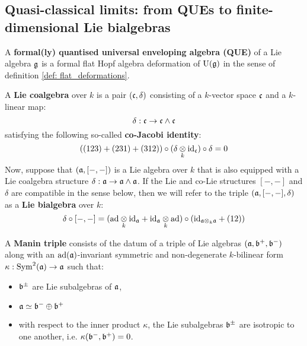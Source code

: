     \subsection{Quasi-classical limits: from QUEs to finite-dimensional Lie bialgebras}
        \begin{definition} \label{def: formal_QUEs}
            A \textbf{formal(ly) quantised universal enveloping algebra (QUE)} of a Lie algebra $\mathfrak{g}$ is a formal flat Hopf algebra deformation of $\mathrm{U}(\mathfrak{g})$ in the sense of definition \ref{def: flat_deformations}.
        \end{definition}
    
        \begin{definition} \label{def: lie_co/bialgebras}
            A \textbf{Lie coalgebra} over $k$ is a pair $(\mathfrak{c}, \delta)$ consisting of a $k$-vector space $\mathfrak{c}$ and a $k$-linear map:
                $$\delta: \mathfrak{c} \to \mathfrak{c} \wedge \mathfrak{c}$$
            satisfying the following so-called \textbf{co-Jacobi identity}:
                $$((123) + (231) + (312)) \circ (\delta \tensor_k \id_\c) \circ \delta = 0$$
            Now, suppose that $(\mathfrak{a}, [-, -])$ is a Lie algebra over $k$ that is also equipped with a Lie coalgebra structure $\delta: \mathfrak{a} \to \mathfrak{a} \wedge \mathfrak{a}$. If the Lie and co-Lie structures $[-, -]$ and $\delta$ are compatible in the sense below, then we will refer to the triple $(\mathfrak{a}, [-, -], \delta)$ as a \textbf{Lie bialgebra} over $k$:
                $$\delta \circ [-, -] = (\ad \tensor_k \id_{\a} + \id_{\a} \tensor_k \ad) \circ (\id_{\a \tensor_k \a} + (12))$$
        \end{definition}
        \begin{definition} \label{def: manin_triples}
            A \textbf{Manin triple} consists of the datum of a triple of Lie algebras $(\mathfrak{a}, \mathfrak{b}^+, \mathfrak{b}^-)$ along with an $\mathrm{ad}(\mathfrak{a})$-invariant symmetric and non-degenerate $k$-bilinear form $\kappa: \mathrm{Sym}^2(\mathfrak{a}) \to \mathfrak{a}$ such that:
                \begin{itemize}
                    \item $\mathfrak{b}^{\pm}$ are Lie subalgebras of $\mathfrak{a}$,
                    \item $\mathfrak{a} \simeq \mathfrak{b}^- \oplus \mathfrak{b}^+$
                    \item with respect to the inner product $\kappa$, the Lie subalgebras $\mathfrak{b}^{\pm}$ are isotropic to one another, i.e. $\kappa(\mathfrak{b}^-, \mathfrak{b}^+) = 0$. 
                \end{itemize}
        \end{definition}
        
